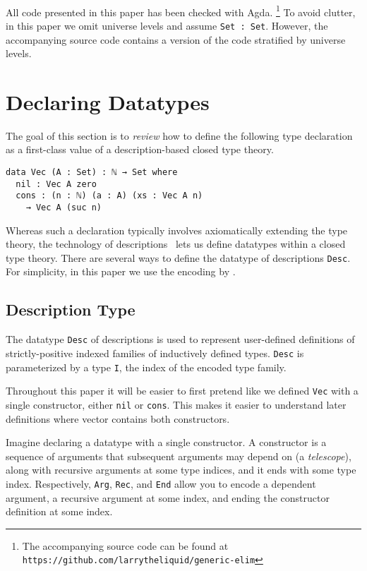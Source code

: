 \documentclass[preprint,nonatbib]{sigplanconf}
\begin{document}
\paragraph{}
All code presented in this paper has been checked with {\sc Agda}.
\footnote{\raggedright{The accompanying source code can be found at
{\tt https://github.com/larrytheliquid/generic-elim}}}
To avoid clutter, in this paper we omit universe levels and assume
{\tt Set : Set}. However, the accompanying source code contains a
version of the code stratified by universe levels.

\section{Declaring Datatypes}
\label{sec:background}

The goal of this section is to {\it review} how to define the following type
declaration as a first-class value of a description-based closed type theory. 

\begin{verbatim}
data Vec (A : Set) : ℕ → Set where
  nil : Vec A zero
  cons : (n : ℕ) (a : A) (xs : Vec A n)
    → Vec A (suc n)
\end{verbatim}

Whereas such a declaration typically involves axiomatically extending
the type theory, the technology of
descriptions~\citep{Chapman:2010:GAL:1932681.1863547,mcbride2010ornamental,dagand:phd}
lets us define datatypes within a closed type theory.
There are
several ways to define the datatype of descriptions {\tt Desc}. 
For simplicity, in this paper we use the encoding by
\citet{mcbride2010ornamental}.

\subsection{Description Type}

The datatype {\tt Desc} of descriptions is used to represent
user-defined definitions of strictly-positive indexed
families of inductively defined types.
{\tt Desc} is parameterized by 
a type {\tt I}, the index of the encoded type family.

Throughout this paper it will be easier to first pretend like we
defined {\tt Vec} with a single constructor, either
{\tt nil} or {\tt cons}. This makes it easier to understand
later definitions where vector contains both constructors.

Imagine declaring a datatype with a single constructor.
A constructor is a sequence of
arguments that subsequent arguments may depend on (a {\it telescope}), along with
recursive arguments at some type indices, and it ends with some type index.
Respectively, {\tt Arg}, {\tt Rec}, and {\tt End} allow you to encode
a dependent argument, a recursive argument at some index, and ending the
constructor definition at some index.
\end{document}
